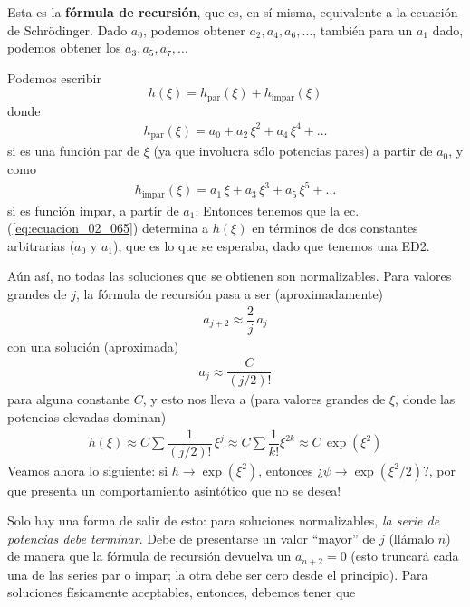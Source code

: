 Esta es la \textbf{fórmula de recursión}, que es, en sí misma, equivalente a la ecuación de Schrödinger. Dado $a_{0}$, podemos obtener $a_{2}, a_{4}, a_{6}, \ldots$, también para un $a_{1}$ dado, podemos obtener los $a_{3}, a_{5}, a_{7}, \ldots$
\par
Podemos escribir
\begin{equation}
h (\xi) = h_{\text{par}} (\xi) + h_{\text{impar}} (\xi)
\label{eq:ecuacion_02_066}
\end{equation}
donde
\begin{align*}
h_{\text{par}} (\xi) = a_{0} + a_{2} \, \xi^{2} + a_{4} \, \xi^{4} + \ldots
\end{align*}
si es una función par de $\xi$ (ya que involucra sólo potencias pares) a partir de $a_{0}$, y como
\begin{align*}
h_{\text{impar}} (\xi) = a_{1} \, \xi + a_{3} \, \xi^{3} + a_{5} \, \xi^{5} + \ldots
\end{align*}
si es función impar, a partir de $a_{1}$. Entonces tenemos que la ec. (\ref{eq:ecuacion_02_065}) determina a $h(\xi)$ en términos de dos constantes arbitrarias ($a_{0}$ y $a_{1}$), que es lo que se esperaba, dado que tenemos una ED2.
\par
Aún así, no todas las soluciones que se obtienen son normalizables. Para valores grandes de $j$, la fórmula de recursión pasa a ser (aproximadamente)
\begin{align*}
a_{j+2} \approx \dfrac{2}{j} \, a_{j}
\end{align*}
con una solución (aproximada)
\begin{align*}
a_{j} \approx \dfrac{C}{(j/2)!}
\end{align*}
para alguna constante $C$, y esto nos lleva a (para valores grandes de $\xi$, donde las potencias elevadas dominan)
\begin{align*}
h (\xi) \approx C \sum \dfrac{1}{(j/2)!} \, \xi^{j} \approx C \sum \dfrac{1}{k!} \xi^{2 k} \approx C \, \exp \left( \xi^{2} \right)
\end{align*}
Veamos ahora lo siguiente: si $h \to \exp \left( \xi^{2} \right)$, entonces ¿$\psi \to \exp \left( \xi^{2}/2 \right)$?, por que presenta un comportamiento asintótico que no se desea!
\par
Solo hay una forma de salir de esto: para soluciones normalizables, \textit{la serie de potencias debe terminar}. Debe de presentarse un valor \enquote{mayor} de $j$ (llámalo $n$) de manera que la fórmula de recursión devuelva un $a_{n+2} = 0$ (esto truncará cada una de las series par o impar; la otra debe ser cero desde el principio). Para soluciones físicamente aceptables, entonces, debemos tener que
